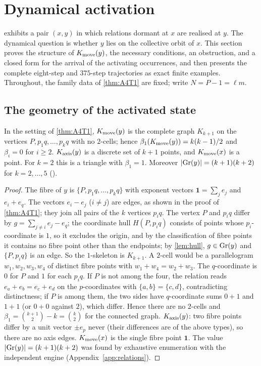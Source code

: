 \section{Dynamical activation}\label{sec:activation}
 exhibits a pair $(x,y)$ in which relations dormant at $x$ are realised at $y$. The dynamical question is whether $y$ lies on the collective orbit of $x$. This section proves the structure of $K_{\mathrm{move}}(y)$, the necessary conditions, an obstruction, and a closed form for the arrival of the activating occurrences, and then presents the complete eight-step and $375$-step trajectories as exact finite examples. Throughout, the family data of \cref{thm:A4T1} are fixed; write $N=P-1=\ell m$.

\subsection{The geometry of the activated state}
\begin{theorem}\label{thm:A4T2}
In the setting of \cref{thm:A4T1}, $K_{\mathrm{move}}(y)$ is the complete graph $K_{k+1}$ on the vertices $P,p_1q,\dots,p_kq$ with no $2$-cells; hence $\beta_1(K_{\mathrm{move}}(y))=k(k-1)/2$ and $\beta_i=0$ for $i\ge2$. $K_{\mathrm{axis}}(y)$ is a discrete set of $k+1$ points, and $K_{\mathrm{move}}(x)$ is a point. For $k=2$ this is a triangle with $\beta_1=1$. Moreover $|\mathrm{Gr}(y)|=(k+1)(k+2)$ for $k=2,\dots,5$ ().
\end{theorem}
\begin{proof}
The fibre of $y$ is $\{P,p_1q,\dots,p_kq\}$ with exponent vectors $\mathbf 1=\sum_je_j$ and $e_i+e_q$. The vectors $e_i-e_j$ ($i\ne j$) are edges, as shown in the proof of \cref{thm:A4T1}; they join all pairs of the $k$ vertices $p_iq$. The vertex $P$ and $p_iq$ differ by $g=\sum_{j\ne i}e_j-e_q$; the coordinate hull $H(P,p_iq)$ consists of points whose $p_i$-coordinate is $1$, so it excludes the origin, and by the classification of fibre points it contains no fibre point other than the endpoints; by \cref{lem:hull}, $g\in\mathrm{Gr}(y)$ and $\{P,p_iq\}$ is an edge. So the $1$-skeleton is $K_{k+1}$. A $2$-cell would be a parallelogram $w_1,w_2,w_3,w_4$ of distinct fibre points with $w_1+w_4=w_2+w_3$. The $q$-coordinate is $0$ for $P$ and $1$ for each $p_iq$. If $P$ is not among the four, the relation reads $e_a+e_b=e_c+e_d$ on the $p$-coordinates with $\{a,b\}=\{c,d\}$, contradicting distinctness; if $P$ is among them, the two sides have $q$-coordinate sums $0+1$ and $1+1$ (or $0+0$ against $2$), which differ. Hence there are no $2$-cells and $\beta_1=\binom{k+1}2-k=\binom k2$ for the connected graph. $K_{\mathrm{axis}}(y)$: two fibre points differ by a unit vector $\pm e_p$ never (their differences are of the above types), so there are no axis edges. $K_{\mathrm{move}}(x)$ is the single fibre point $\mathbf 1$. The value $|\mathrm{Gr}(y)|=(k+1)(k+2)$ was found by exhaustive enumeration with the independent engine (Appendix~\ref{app:relations}). \qedhere
\end{proof}
